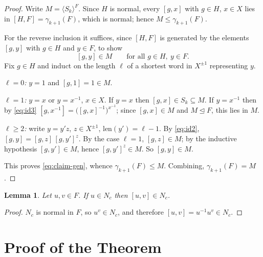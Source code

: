 \documentclass{amsart}
\newtheorem{lemma}{Lemma}
\theoremstyle{definition}
\theoremstyle{remark}
\begin{document}
\begin{proof}
Write $M=\langle S_k\rangle^{F}$. Since $H$ is normal, every $[g,x]$ with $g\in H$,
$x\in X$ lies in $[H,F]=\gamma_{k+1}(F)$, which is normal; hence
$M\le\gamma_{k+1}(F)$.

For the reverse inclusion it suffices, since $[H,F]$ is generated by the elements
$[g,y]$ with $g\in H$ and $y\in F$, to show
\begin{equation}\label{eq:claim-gen}
[g,y]\in M\qquad\text{for all } g\in H,\ y\in F.
\end{equation}
Fix $g\in H$ and induct on the length $\ell$ of a shortest word in $X^{\pm1}$
representing $y$.

\emph{$\ell=0$:} $y=1$ and $[g,1]=1\in M$.

\emph{$\ell=1$:} $y=x$ or $y=x^{-1}$, $x\in X$. If $y=x$ then $[g,x]\in S_k\subseteq M$.
If $y=x^{-1}$ then by \eqref{eq:id3} $[g,x^{-1}]=\big([g,x]^{-1}\big)^{x^{-1}}$;
since $[g,x]\in M$ and $M\trianglelefteq F$, this lies in $M$.

\emph{$\ell\ge 2$:} write $y=y'z$, $z\in X^{\pm1}$, $\mathrm{len}(y')=\ell-1$. By
\eqref{eq:id2}, $[g,y]=[g,z]\,[g,y']^{z}$. By the case $\ell=1$, $[g,z]\in M$; by
the inductive hypothesis $[g,y']\in M$, hence $[g,y']^{z}\in M$. So $[g,y]\in M$.

This proves \eqref{eq:claim-gen}, whence $\gamma_{k+1}(F)\le M$. Combining,
$\gamma_{k+1}(F)=M$.
\end{proof}

\begin{lemma}\label{lem:caseA}
Let $u,v\in F$. If $u\in N_c$ then $[u,v]\in N_c$.
\end{lemma}

\begin{proof}
$N_c$ is normal in $F$, so $u^{v}\in N_c$, and therefore
$[u,v]=u^{-1}u^{v}\in N_c$.
\end{proof}

\section{Proof of the Theorem}\label{sec:proof}
\end{document}

